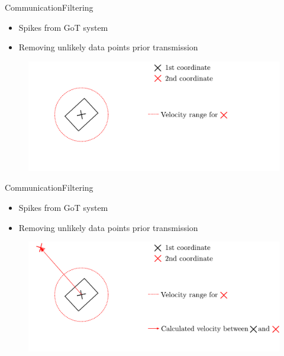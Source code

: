 \begin{frame}{Communication}{Filtering}
  \begin{itemize}
    \item Spikes from GoT system
    \item Removing unlikely data points prior transmission
  \end{itemize}
  
  \begin{figure}
  	\includegraphics[scale = .5]{Pictures/comFilter1.pdf}
  \end{figure}
  
\end{frame}
\begin{frame}{Communication}{Filtering}
  \begin{itemize}
    \item Spikes from GoT system
    \item Removing unlikely data points prior transmission
  \end{itemize}
  
  \begin{figure}
  	\includegraphics[scale = .5]{Pictures/comFilter2.pdf}
  \end{figure}
  
\end{frame}
